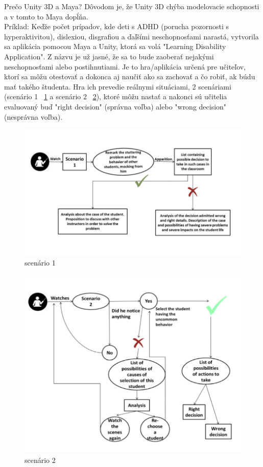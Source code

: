 \documentclass[10pt,oneside,slovak,a4paper]{article}
\begin{document}
Prečo Unity 3D a Maya? Dôvodom je, že Unity 3D chýba modelovacie schopnosti a v tomto to Maya dopĺňa.\cite{labschutz2011content}\\

Príklad:
Keďže počet prípadov, kde deti s ADHD (porucha pozornosti s hyperaktivitou), dislexiou, disgrafiou a ďaľšími neschopnosťami narastá, vytvorila sa aplikácia pomocou Maya a Unity, ktorá sa volá "Learning Disability Application". Z názvu je už jasné, že sa to bude zaoberať nejakými neschopnosťami alebo postihnutiami. Je to hra/aplikácia určená pre učiteľov, ktorí sa môžu otestovať a dokonca aj naučiť ako sa zachovať a čo robiť, ak búdu mať takého študenta. Hra ich prevedie reálnymi situáciami, 2 scenáriami (scenário 1 ~\ref{f:scenario1} a scenário 2 ~\ref{f:scenario2}), ktoré môžu nastať a nakonci sú učitelia evaluovaný buď "right decision" (správna voľba) alebo "wrong decision" (nesprávna voľba)\cite{studies}.

\begin{figure}[h]
\centering
\includegraphics[scale=0.37]{scenario 1.png}
\caption{scenário 1\cite{studies}}
\label{f:scenario1}
\end{figure}
\begin{figure}[h]
\centering
\includegraphics[scale=0.37]{scenario 2.png}
\caption{scenário 2\cite{studies}}
\label{f:scenario2}
\end{figure}
\end{document}
